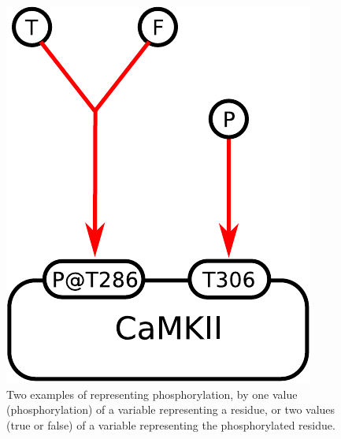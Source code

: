 \begin{figure}[H]
  \centering
  \includegraphics[scale = 0.5]{examples/ex-assignment}
  \caption{Two examples of  representing phosphorylation, by one value (phosphorylation) of a variable representing a residue, or two values (true or false) of a variable representing the phosphorylated residue.}
  \label{fig:ex-assignment}
\end{figure}


\normalcolor
